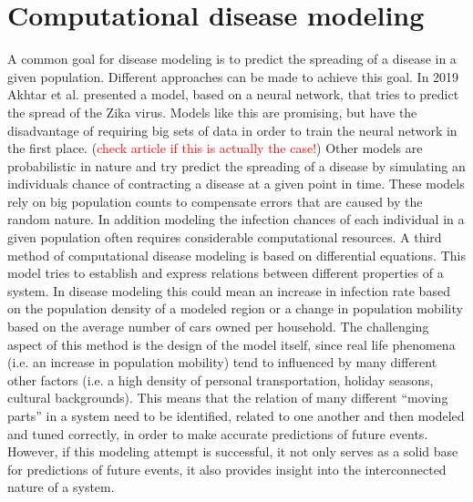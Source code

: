 \section{Computational disease modeling}
A common goal for disease modeling is to predict the spreading of a disease in a given population. Different approaches can be made to
achieve this goal. In 2019 Akhtar et al. presented a model, based on a neural network, that tries to predict the spread of the Zika virus\cite{note}.
Models like this are promising, but have the disadvantage of requiring big sets of data in order to train the neural network in the first place.
(\textcolor{red}{check article if this is actually the case!}) %
Other models are probabilistic in nature and try predict the spreading of a disease by simulating an individuals chance of contracting a
disease at a given point in time\cite{??}. These models rely on big population counts to compensate errors that are caused by the random nature.
In addition modeling the infection chances of each individual in a given population often requires considerable computational resources\cite{??}.
A third method of computational disease modeling is based on differential equations. This model tries to establish and express relations between different
properties of a system. In disease modeling this could mean an increase in infection rate based on the population density of a modeled region or a
change in population mobility based on the average number of cars owned per household\cite{??}. The challenging aspect of this method is the design
of the model itself, since real life phenomena (i.e. an increase in population mobility) tend to influenced by many different other factors (i.e.
a high density of personal transportation, holiday seasons, cultural backgrounds). This means that the relation of many different ``moving parts'' in a
system need to be identified, related to one another and then modeled and tuned correctly, in order to make accurate predictions of future events. However,
if this modeling attempt is successful, it not only serves as a solid base for predictions of future events, it also provides insight into the interconnected
nature of a system.


